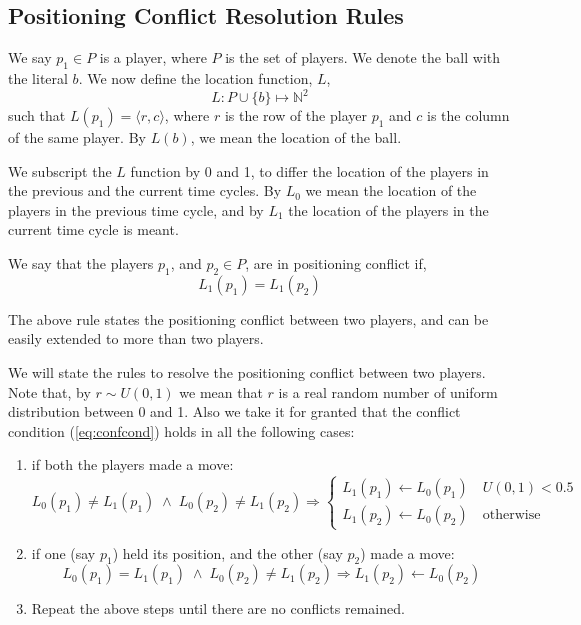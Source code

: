 \documentclass[12pt,titlepage,a4paper]{article}
\begin{document}
\subsection{Positioning Conflict Resolution Rules}

We say $p_1 \in P$ is a player, where $P$ is the set of players. We denote the ball with the literal $b$. We now define the location function, $L$,
\[
L : P \cup \{b\} \longmapsto \mathbb{N}^2
\]
such that $L(p_1) = \langle r, c\rangle$, where $r$ is the row of the player $p_1$ and $c$ is the column of the same player. By $L(b)$, we mean the location of the ball.

We subscript the $L$ function by 0 and 1, to differ the location of the players in the previous and the current time cycles. By $L_0$ we mean the location of the players in the previous time cycle, and by $L_1$ the location of the players in the current time cycle is meant.

We say that the players $p_1$, and $p_2 \in P$, are in positioning conflict if,
\begin{equation} \label{eq:confcond}
L_1(p_1) = L_1(p_2)
\end{equation}

The above rule states the positioning conflict between two players, and can be easily extended to more than two players. 

We will state the rules to resolve the positioning conflict between two players. Note that, by $r \sim U(0,1)$ we mean that $r$ is a real random number of uniform distribution between 0 and 1. Also we take it for granted that the conflict condition (\ref{eq:confcond}) holds in all the following cases:

\begin{enumerate}
\item if both the players made a move:
\[ 
  L_0(p_1) \neq L_1(p_1) \; \wedge \; L_0(p_2) \neq L_1(p_2) \Longrightarrow
  \begin{cases} 
   L_1(p_1) \gets L_0(p_1) \quad U(0,1) < 0.5\\
   L_1(p_2) \gets L_0(p_2) \quad \text{otherwise}
  \end{cases}
\]

\item if one (say $p_1$) held its position, and the other (say $p_2$) made a move:
\[
  L_0(p_1) = L_1(p_1) \; \wedge \; L_0(p_2) \neq L_1(p_2) \Longrightarrow L_1(p_2) \gets L_0(p_2)
\]

\item Repeat the above steps until there are no conflicts remained.
\end{enumerate}
\end{document}
